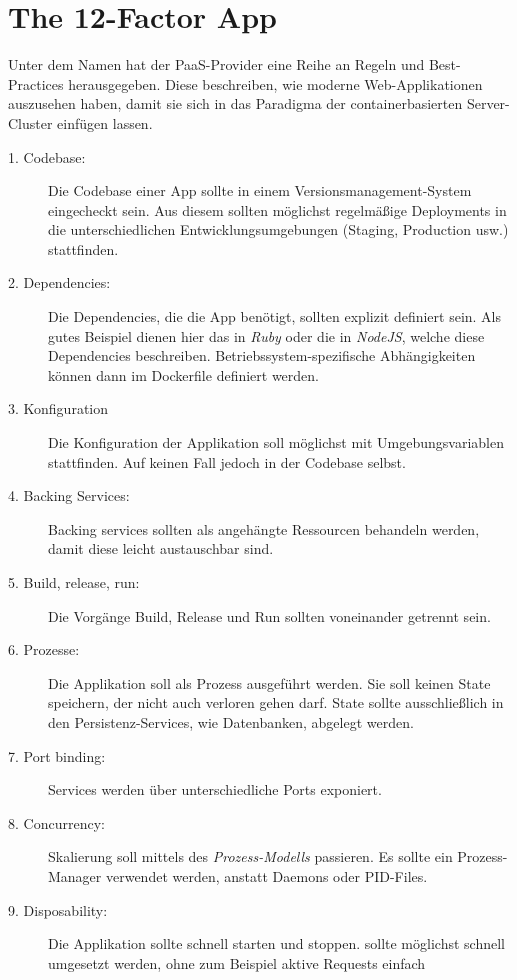 \section{The 12-Factor App}
Unter dem Namen  hat der PaaS-Provider  eine Reihe
an Regeln und Best-Practices herausgegeben. Diese beschreiben, wie moderne
Web-Applikationen auszusehen haben, damit sie sich in das Paradigma der
containerbasierten Server-Cluster einfügen lassen. \cite{12factor}

\begin{description}
  \item[1. Codebase:]
  Die Codebase einer App sollte in einem Versionsmanagement-System eingecheckt sein.
  Aus diesem sollten möglichst regelmäßige Deployments in die unterschiedlichen
  Entwicklungsumgebungen (Staging, Production usw.) stattfinden.
  \item[2. Dependencies:]
  Die Dependencies, die die App benötigt, sollten explizit definiert sein.
  Als gutes Beispiel dienen hier das  in \emph{Ruby} oder die
   in \emph{NodeJS}, welche diese Dependencies beschreiben.
  Betriebssystem-spezifische Abhängigkeiten können dann im Dockerfile definiert
  werden.
  \item[3. Konfiguration]
  Die Konfiguration der Applikation soll möglichst mit Umgebungsvariablen
  stattfinden. Auf keinen Fall jedoch in der Codebase selbst.
  \item[4. Backing Services:]
  Backing services sollten als angehängte Ressourcen behandeln werden, damit
  diese leicht austauschbar sind.
  \item[5. Build, release, run:]
  Die Vorgänge Build, Release und Run sollten voneinander getrennt sein.
  \item[6. Prozesse:]
  Die Applikation soll als Prozess ausgeführt werden.
  Sie soll keinen State speichern, der nicht auch verloren gehen darf. State sollte
  ausschließlich in den Persistenz-Services, wie Datenbanken, abgelegt werden.
  \item[7. Port binding:]
  Services werden über unterschiedliche Ports exponiert.
  \item[8. Concurrency:]
  Skalierung soll mittels des \emph{Prozess-Modells} passieren. Es sollte ein
  Prozess-Manager verwendet werden, anstatt Daemons oder PID-Files.
  \item[9. Disposability:]
  Die Applikation sollte schnell starten und stoppen.
   sollte
  möglichst schnell umgesetzt werden, ohne zum Beispiel aktive Requests einfach

\end{description}

